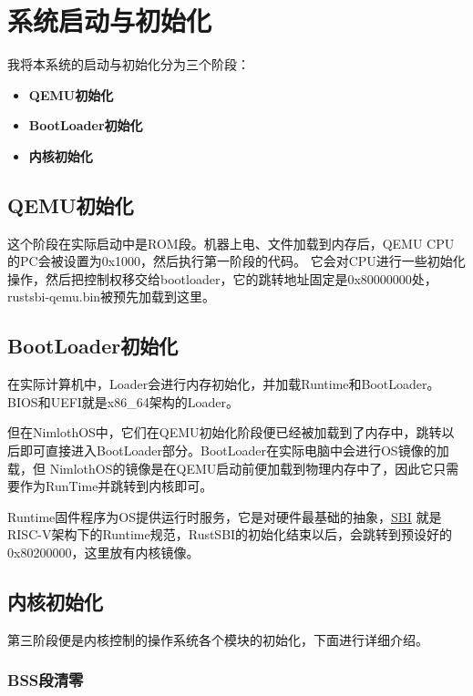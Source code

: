 \chapter{系统启动与初始化}

我将本系统的启动与初始化分为三个阶段：

\begin{itemize}
    \item \textbf{QEMU初始化}
    \item \textbf{BootLoader初始化}
    \item \textbf{内核初始化}
\end{itemize}

\section{QEMU初始化}

这个阶段在实际启动中是ROM段。机器上电、文件加载到内存后，QEMU CPU的PC会被设置为0x1000，然后执行第一阶段的代码。
它会对CPU进行一些初始化操作，然后把控制权移交给bootloader，它的跳转地址固定是0x80000000处，rustsbi-qemu.bin被预先加载到这里。

\section{BootLoader初始化}

在实际计算机中，Loader会进行内存初始化，并加载Runtime和BootLoader。BIOS和UEFI就是x86\_64架构的Loader。


但在NimlothOS中，它们在QEMU初始化阶段便已经被加载到了内存中，跳转以后即可直接进入BootLoader部分。BootLoader在实际电脑中会进行OS镜像的加载，但
NimlothOS的镜像是在QEMU启动前便加载到物理内存中了，因此它只需要作为RunTime并跳转到内核即可。

Runtime固件程序为OS提供运行时服务，它是对硬件最基础的抽象，\href{https://github.com/riscv-non-isa/riscv-sbi-doc}{SBI}
就是RISC-V架构下的Runtime规范，RustSBI的初始化结束以后，会跳转到预设好的0x80200000，这里放有内核镜像。

\section{内核初始化}

第三阶段便是内核控制的操作系统各个模块的初始化，下面进行详细介绍。

\subsection{BSS段清零}

